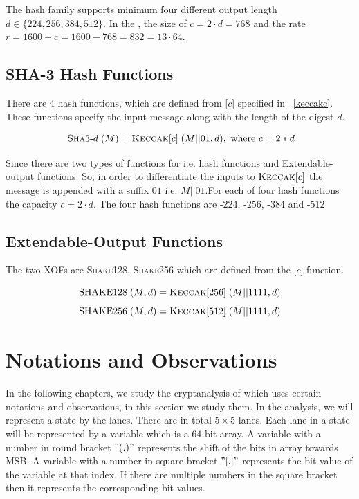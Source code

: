 The  hash family supports minimum four different output length $d \in \{224,256,384,512\}$. In the , the size of $c = 2\cdot d = 768$ and the rate $r = 1600 - c = 1600 - 768 = 832= 13\cdot 64$.

\subsection{SHA-3 Hash Functions}

There are $4$  hash functions, which are defined from \KECCAK{}[$c$] specified in ~\ref{keccakc}. These functions specify the input message along with the length of the digest $d$.

\[
   \text{ \textsc{Sha}3-}d\;(M) = \mbox{\textsc{Keccak}}{}[c]\;(M||01 , d), \text{ where } c = 2*d
\]

Since there are two types of functions for  i.e. hash functions and Extendable-output functions. So, in order to differentiate the inputs to $\mbox{\textsc{Keccak}}{}[c]$ the message is appended with a suffix $01$ i.e. $M||01$.For each of four hash functions the capacity $c = 2\cdot d$. The four hash functions are -224, -256, -384 and -512

\subsection{ Extendable-Output Functions}

The two  XOFs are \textsc{Shake}128, \textsc{Shake}256 which are defined from the \KECCAK{}[$c$] function.

\[
    \text{SHAKE}128\;(M,d) = \mbox{\textsc{Keccak}}{}[256]\;(M||1111 , d)
\]
\[
    \text{SHAKE}256\;(M,d) = \mbox{\textsc{Keccak}}{}[512]\;(M||1111 , d)
\]

\section{Notations and Observations}

In the following chapters, we study the cryptanalysis of \KECCAK{} which uses certain notations and observations, in this section we study them.
In the analysis, we will represent a state by the lanes. There are in total $5\times 5$ lanes. Each lane in a state will be represented by a variable which is a $64$-bit array. 
A variable with a number in round bracket $"( . )"$ represents the shift of the bits in array towards MSB. A variable with a number in square bracket $"[ . ]"$ represents the bit value of the variable at that index. If there are multiple numbers in the square bracket then it represents the corresponding bit values.


